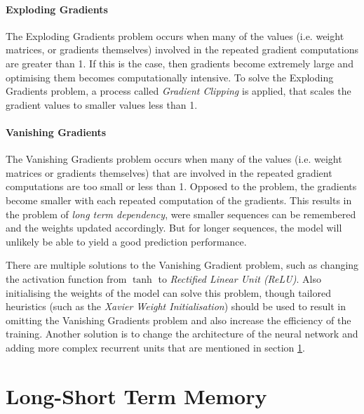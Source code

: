             
            \paragraph{Exploding Gradients}
            \label{par:exploding-gradients-background}

                The Exploding Gradients problem occurs when many of the values (i.e. weight matrices, or gradients themselves) involved in the repeated gradient computations are greater than 1. 
                If this is the case, then gradients become extremely large and optimising them becomes computationally intensive.
                To solve the Exploding Gradients problem, a process called \emph{Gradient Clipping} is applied, that scales the gradient values to smaller values less than 1.


            \paragraph{Vanishing Gradients}
            \label{par:vanishing-gradients-background}

                The Vanishing Gradients problem occurs when many of the values (i.e. weight matrices or gradients themselves) that are involved in the repeated gradient computations are too small or less than 1. Opposed to the  problem, the gradients become smaller with each repeated computation of the gradients.
                This results in the problem of \emph{long term dependency}, were smaller sequences can be remembered and the weights updated accordingly. But for longer sequences, the model will unlikely be able to yield a good prediction performance.

                There are multiple solutions to the Vanishing Gradient problem, such as changing the activation function from $\tanh$ to \emph{Rectified Linear Unit (ReLU)}. Also initialising the weights of the model can solve this problem, though tailored heuristics (such as the \emph{Xavier Weight Initialisation}) should be used to result in omitting the Vanishing Gradients problem and also increase the efficiency of the training. Another solution is to change the architecture of the neural network and adding more complex recurrent units that are mentioned in section \ref{sec:lstm-background}.

    \section{Long-Short Term Memory}
    \label{sec:lstm-background}

